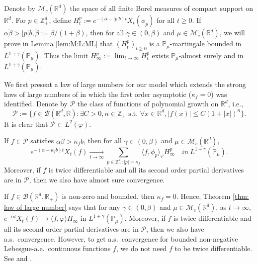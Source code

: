 \documentclass[EJP]{ejpecp} %
\begin{document}
	Denote by $\mathcal M_c(\mathbb R^d)$ the space of all finite Borel measures of compact support on $\mathbb R^d$.
	For $p\in \mathbb{Z}_+^d$, define
\(
  	H_t^p
  	:= e^{-(\alpha-|p|b)t}X_t(\phi_p)
\)
	for all $t\geq 0$.
	If $\alpha \tilde \beta>|p|b, \tilde \beta := \beta/(1+\beta)$, then for all $\gamma\in (0, \beta)$ and $\mu\in \mathcal M_c(\mathbb R^d)$, we will prove in Lemma \ref{lem:M:L:ML} that $(H_t^p)_{t\geq 0}$ is a $\mathbb{P}_{\mu}$-martingale bounded in $L^{1+\gamma}(\mathbb{P}_{\mu})$.
	Thus the limit $H^p_{\infty}:=\lim_{t\rightarrow \infty}H_t^p$ exists $\mathbb{P}_{\mu}$-almost surely and in $L^{1+\gamma}(\mathbb{P}_{\mu})$.

	We first present a law of large numbers for our model which extends the strong laws of large numbers of \cite{ChenRenYang2019Skeleton, EckhoffKyprianouWinkel2015Spines} in which the first order asymptotic ($\kappa_f=0$) was identified.
	Denote by $\mathcal P$ the class of functions of polynomial growth on $\mathbb R^d$, i.e.,
\begin{equation}
\label{eq: polynomial growth function}
  	\mathcal{P}
  	:= \{f\in \mathcal B(\mathbb R^d, \mathbb R):\exists C>0, n \in \mathbb Z_+ \text{~s.t.~} \forall x\in \mathbb R^d, |f(x)|\leq C(1+|x|)^n \}.
\end{equation}
	It is clear that $\mathcal{P} \subset L^2(\varphi)$.
\begin{theorem}
\label{thm: law of large number}
 	If $f \in \mathcal{P}$ satisfies $\alpha\tilde \beta>\kappa_f b$, then for all $\gamma\in (0, \beta)$ and  $\mu\in \mathcal M_c(\mathbb R^d)$,
\[
   	e^{-(\alpha-\kappa_fb)t}X_t(f)
    \xrightarrow[t\to \infty]{}\sum_{p\in \mathbb Z_+^d:|p|=\kappa_f}\langle f, \phi_p\rangle_{\varphi} H_{\infty}^p
    \quad in~ L^{1+\gamma}(\mathbb{P}_{\mu}).
\]
	Moreover, if $f$ is twice differentiable and all its second order partial derivatives are in $\mathcal{P}$, then we also have almost sure convergence.
\end{theorem}
	If $f\in \mathcal B(\mathbb R^d, \mathbb R_+)$ is
	non-zero and  bounded, then $\kappa_f=0$.
	Hence, Theorem \ref{thm: law of large number} says that for any $\gamma\in (0, \beta)$ and  $\mu\in \mathcal M_c(\mathbb R^d)$, as $t\rightarrow \infty$, $e^{-\alpha t}X_t(f) \rightarrow \langle f, \varphi\rangle H_{\infty}$ in $L^{1+\gamma}(\mathbb{P}_{\mu})$.
	Moreover, if $f$ is twice differentiable and all its second order partial derivatives are in $\mathcal{P}$, then we also have a.s.\ convergence.
	However, to get a.s.\ convergence for bounded non-negative Lebesgue-a.e.\ continuous functions $f$, we do not need $f$ to be twice differentiable.
	See \cite[Theorem 2.13 \& Example 8.1]{ChenRenYang2019Skeleton} and \cite[Theorem 1.2 \& Example 4.1]{EckhoffKyprianouWinkel2015Spines}.
\end{document}
